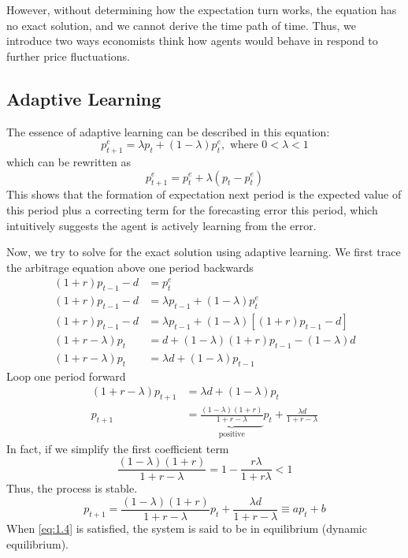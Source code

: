\documentclass[twocolumn, fleqn]{article}
\begin{document}
		However, without determining how the expectation turn works, the equation has no exact solution, and we
		cannot derive the time path of time.
		Thus, we introduce two ways economists think how agents would behave in respond to further price fluctuations.

		\subsection{Adaptive Learning}
			The essence of adaptive learning can be described in this equation:
			\begin{equation}
				p_{t+1}^e = \lambda p_t + (1-\lambda)p_t^e, \text{ where } 0<\lambda<1
			\end{equation}
			which can be rewritten as
			\begin{equation*}
				p_{t+1}^e = p_t^e + \lambda(p_t - p_t^e)
			\end{equation*}
			This shows that the formation of expectation next period is the expected value of this period plus a
			correcting term for the forecasting error this period, which intuitively suggests the agent is actively learning from the error.

			Now, we try to solve for the exact solution using adaptive learning.
			We first trace the arbitrage equation above one period backwards
			\begin{align*}
			(1+r)p_{t-1} -d &=  p_t^e\\
		(1+r)p_{t-1} -d &= \lambda p_{t-1} + (1-\lambda)p_t^e\\
		(1+r)p_{t-1} -d &= \lambda p_{t-1} + (1-\lambda)[(1+r)p_{t-1}-d]\\
		(1+r-\lambda) p_t &= d + (1-\lambda)(1+r)p_{t-1} - (1-\lambda)d\\
		(1+r-\lambda) p_t &= \lambda d + (1-\lambda)p_{t-1}
			\end{align*}
			Loop one period forward
			\begin{align*}
			(1+r-\lambda) p_{t+1} &= \lambda d + (1-\lambda)p_{t}\\[4pt]
		p_{t+1}&= \underbrace{\frac{(1-\lambda)(1+r)}{1+r-\lambda}}_{\text{positive}} p_t + \frac{\lambda d}{1+r-\lambda}
			\end{align*}
			In fact, if we simplify the first coefficient term
			\begin{equation*}
				\frac{(1-\lambda)(1+r)}{1+r-\lambda} = 1-\frac{r \lambda}{1+r\lambda}<1
			\end{equation*}
			Thus, the process is stable.
			\begin{equation}
				p_{t+1} = \frac{(1-\lambda)(1+r)}{1+r-\lambda} p_t + \frac{\lambda d}{1+r-\lambda} \equiv a p_t+b
				\label{eq:1.4}
			\end{equation}
			When \eqref{eq:1.4} is satisfied, the system is said to be in equilibrium (dynamic equilibrium).
\end{document}
